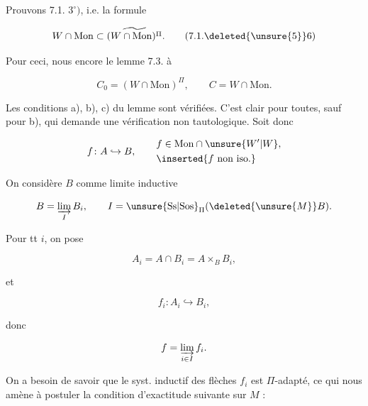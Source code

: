 

Prouvons 7.1. $3^\circ)$,  i.e. la formule

\[
W\cap\mathrm{Mon}\subset\widetilde{(W\cap\mathrm{Mon})^\Pi}.\tag*{(7.1.\deleted{\unsure{5}}6)}
\]

Pour ceci, nous  encore le lemme 7.3. à

\[
C_0=(W\cap\mathrm{Mon})^\Pi,\qquad C=W\cap\mathrm{Mon}.
\]

Les conditions a), b), c)  du lemme sont vérifiées. C'est clair pour toutes, sauf pour b), qui demande une vérification non tautologique. Soit donc

\[
f\colon A\hookrightarrow B,\qquad \begin{aligned}&f\in\mathrm{Mon}\cap\unsure{W'|W},\\&\inserted{f\text{ non iso.}}\end{aligned}
\]

On considère $B$ comme limite inductive

\[
B=\varinjlim_I B_i,\qquad I=\unsure{\mathrm{Ss}|\mathrm{Sos}}_\Pi(\deleted{\unsure{M}}B).
\]


Pour tt $i$, on pose

\[
A_i=A\cap B_i=A\times_B B_i,
\]

et

\[
f_i\colon A_i\hookrightarrow B_i,
\]

donc

\[
f=\varinjlim_{i\in I} f_i.
\]

On a besoin de savoir que le syst. inductif des flèches $f_i$ est $\Pi$-adapté, ce qui nous amène à postuler la condition d'exactitude  suivante sur $M$ :
